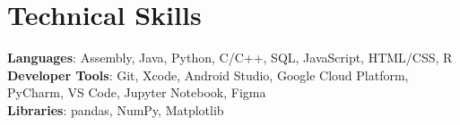 \documentclass[letterpaper,11pt]{article}
\begin{document}
\section{Technical Skills}
 \begin{itemize}[leftmargin=0.15in, label={}]
    \small{\item{
     \textbf{Languages}{: Assembly, Java, Python, C/C++, SQL, JavaScript, HTML/CSS, R} \\
     \textbf{Developer Tools}{: Git, Xcode, Android Studio, Google Cloud Platform, PyCharm, VS Code, Jupyter Notebook, Figma} \\
     \textbf{Libraries}{: pandas, NumPy, Matplotlib}
    }}
 \end{itemize}
\end{document}
